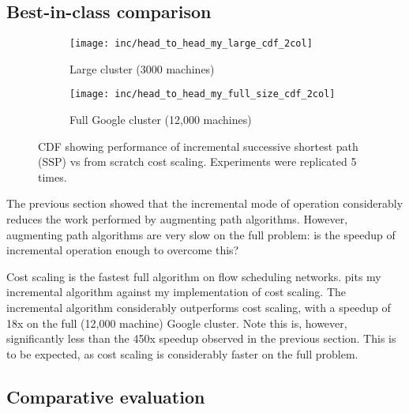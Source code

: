 
\subsection{Best-in-class comparison}

\begin{figure}
    \begin{widepage}
        \begin{subfigure}[c]{0.5\textwidth}
            \texttt{[image: inc/head\_to\_head\_my\_large\_cdf\_2col]}
            \caption{Large cluster (3000 machines)}
        \end{subfigure}
        \begin{subfigure}[c]{0.5\textwidth}
            \texttt{[image: inc/head\_to\_head\_my\_full\_size\_cdf\_2col]}
            \caption{Full Google cluster (12,000 machines)}
        \end{subfigure}
    \end{widepage}
    \caption[Performance of incremental successive shortest path vs from scratch cost scaling]{CDF showing performance of incremental successive shortest path (SSP) vs from scratch cost scaling. Experiments were replicated 5 times.}
    \label{fig:inc-head-to-head-my}
\end{figure}

The previous section showed that the incremental mode of operation considerably reduces the work performed by augmenting path algorithms. However, augmenting path algorithms are very slow on the full problem\footnotemark: is the speedup of incremental operation enough to overcome this?

Cost scaling is the fastest full algorithm on flow scheduling networks.  pits my incremental algorithm against my implementation of cost scaling. The incremental algorithm considerably outperforms cost scaling, with a speedup of 18x on the full (12,000 machine) Google cluster. Note this is, however, significantly less than the 450x speedup observed in the previous section. This is to be expected, as cost scaling is considerably faster on the full problem.

\subsection{Comparative evaluation}

